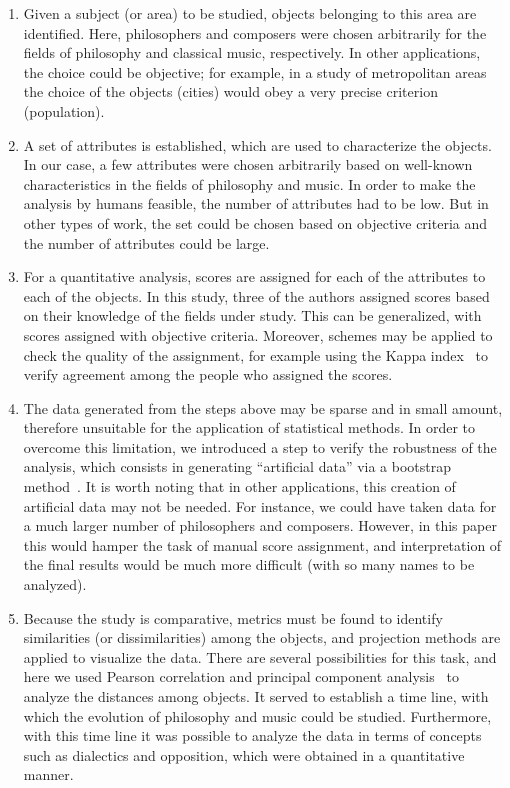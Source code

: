 \documentclass[
 aip,
 jmp,
 amsmath,amssymb,
 reprint,
]{revtex4-1}
\begin{document}
\begin{enumerate}
  \item{Given a subject (or area) to be studied, objects belonging to
    this area are identified. Here, philosophers and composers were
    chosen arbitrarily for the fields of philosophy and classical
    music, respectively. In other applications, the choice could be
    objective; for example, in a study of metropolitan areas the
    choice of the objects (cities) would obey a very precise criterion
    (population).}

  \item{A set of attributes is established, which are used to
    characterize the objects. In our case, a few attributes were
    chosen arbitrarily based on well-known characteristics in the
    fields of philosophy and music. In order to make the analysis by
    humans feasible, the number of attributes had to be low. But in
    other types of work, the set could be chosen based on objective
    criteria and the number of attributes could be large.}

  \item{For a quantitative analysis, scores are assigned for each of
    the attributes to each of the objects. In this study, three of the
    authors assigned scores based on their knowledge of the fields
    under study. This can be generalized, with scores assigned with
    objective criteria. Moreover, schemes may be applied to check the
    quality of the assignment, for example using the Kappa
    index~\cite{Cohen1960} to verify agreement among the people who
    assigned the scores.}

  \item{The data generated from the steps above may be sparse and in
    small amount, therefore unsuitable for the application of
    statistical methods. In order to overcome this limitation, we
    introduced a step to verify the robustness of the analysis, which
    consists in generating ``artificial data'' via a bootstrap
    method~\cite{Boos2003}. It is worth noting that in other
    applications, this creation of artificial data may not be
    needed. For instance, we could have taken data for a much larger
    number of philosophers and composers. However, in this paper this
    would hamper the task of manual score assignment, and
    interpretation of the final results would be much more difficult
    (with so many names to be analyzed).}

  \item{Because the study is comparative, metrics must be found to
    identify similarities (or dissimilarities) among the objects, and
    projection methods are applied to visualize the data. There are
    several possibilities for this task, and here we used Pearson
    correlation and principal component analysis~\cite{Costa} to
    analyze the distances among objects. It served to establish a time
    line, with which the evolution of philosophy and music could be
    studied. Furthermore, with this time line it was possible to
    analyze the data in terms of concepts such as dialectics and
    opposition, which were obtained in a quantitative manner.}
\end{enumerate}
\end{document}
